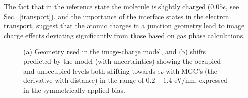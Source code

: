 \documentclass[aip,jcp,a4paper,reprint,floatfix,superscriptaddress]{revtex4-1}
\begin{document}
The fact that in the reference state the molecule is slightly charged ($0.05e$, see Sec.~\ref{transport}), and the importance of the interface states in the electron transport, suggest that the atomic charges in a junction geometry lead to image charge effects deviating significantly from those based on gas phase calculations.

\begin{figure}
\caption{
(a) Geometry used in the image-charge model, and (b) shifts predicted by the model (with uncertainties) showing the occupied- and unoccupied-levels both shifting towards $\epsilon_F$ with MGC's (the derivative with distance) in the range of $0.2-1.4$ eV/nm, expressed in the symmetrically applied bias. 
}\label{fg:Shifts}
\end{figure}
\end{document}
